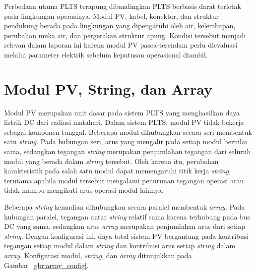 Perbedaan utama PLTS terapung dibandingkan PLTS berbasis darat terletak pada
lingkungan operasinya. Modul PV, kabel, konektor, dan struktur pendukung berada
pada lingkungan yang dipengaruhi oleh air, kelembapan, perubahan muka air, dan
pergerakan struktur apung. Kondisi tersebut menjadi relevan dalam laporan ini
karena modul PV pasca-terendam perlu dievaluasi melalui parameter elektrik
sebelum keputusan operasional diambil.

\section{Modul PV, String, dan Array}

Modul PV merupakan unit dasar pada sistem PLTS yang menghasilkan daya listrik
DC dari radiasi matahari. Dalam sistem PLTS, modul PV tidak bekerja sebagai
komponen tunggal. Beberapa modul dihubungkan secara seri membentuk satu
\textit{string}. Pada hubungan seri, arus yang mengalir pada setiap modul
bernilai sama, sedangkan tegangan \textit{string} merupakan penjumlahan
tegangan dari seluruh modul yang berada dalam \textit{string} tersebut. Oleh
karena itu, perubahan karakteristik pada salah satu modul dapat memengaruhi
titik kerja \textit{string}, terutama apabila modul tersebut mengalami
penurunan tegangan operasi atau tidak mampu mengikuti arus operasi modul
lainnya.

Beberapa \textit{string} kemudian dihubungkan secara paralel membentuk
\textit{array}. Pada hubungan paralel, tegangan antar \textit{string} relatif
sama karena terhubung pada bus DC yang sama, sedangkan arus \textit{array}
merupakan penjumlahan arus dari setiap \textit{string}. Dengan konfigurasi ini,
daya total sistem PV bergantung pada kontribusi tegangan setiap modul dalam
\textit{string} dan kontribusi arus setiap \textit{string} dalam
\textit{array}. Konfigurasi modul, \textit{string}, dan \textit{array}
ditunjukkan pada Gambar~\ref{gbr:array_config}.

